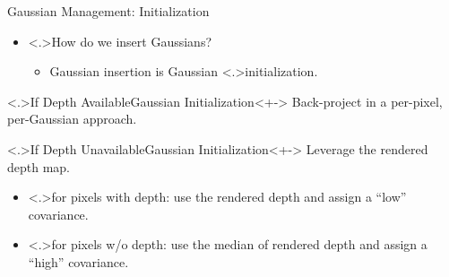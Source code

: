 \begin{Frame}{Gaussian Management: Initialization}
	\begin{itemize}
		\setlength{\itemsep}{1.5ex}
		\item<+-> \alert<.>{How} do we insert Gaussians?
			\vspace*{1.5ex}
			\begin{itemize}
				\setlength{\itemsep}{1.5ex}
				\item<+-> Gaussian insertion is Gaussian \alert<.>{initialization}.
			\end{itemize}
	\end{itemize}
	\vspace*{\fill}
	\begin{block}{\alert<.>{If Depth Available}\hfill Gaussian Initialization}<+->
		Back-project in a per-pixel, per-Gaussian approach.
	\end{block}
	\vspace*{\fill}
	\begin{block}{\alert<.>{If Depth Unavailable}\hfill Gaussian Initialization}<+->
		Leverage the rendered depth map.
		\vspace*{1.5ex}
		\begin{itemize}[<+->]
			\setlength{\itemsep}{1.5ex}
			\item \alert<.>{for pixels with depth:} use the rendered depth and assign a ``low'' covariance.
			\item \alert<.>{for pixels w/o depth:} use the median of rendered depth and assign a ``high'' covariance.
		\end{itemize}
	\end{block}
\end{Frame}

